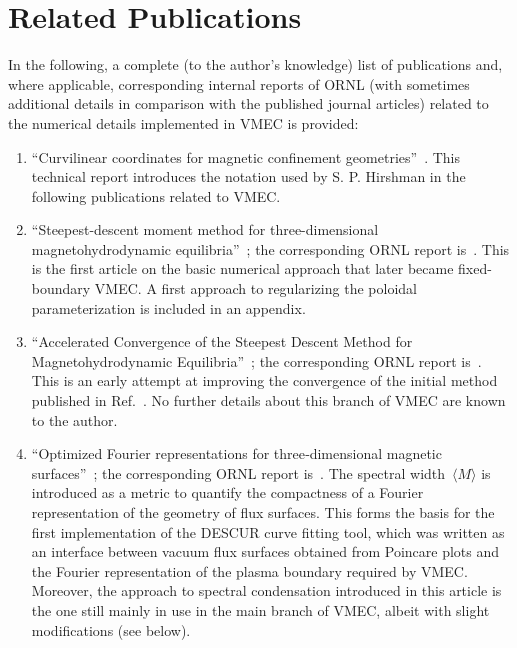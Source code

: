 \documentclass[a4paper,11pt]{book}
\begin{document}
\section*{Related Publications}
%
In the following, a complete (to the author's knowledge) list
of publications and, where applicable, corresponding internal reports of ORNL
(with sometimes additional details in comparison with the published journal articles)
related to the numerical details implemented in VMEC is provided:
\begin{enumerate}
 \item ``Curvilinear coordinates for magnetic confinement geometries''~\cite{ornl_tm_8393_hirshman_1982}.
       This technical report introduces the notation used by S. P. Hirshman
       in the following publications related to VMEC.
 \item ``Steepest-descent moment method for three-dimensional magnetohydrodynamic equilibria''~\cite{hirshman_whitson_1983};
       the corresponding ORNL report is~\cite{ornl_tm_8861_hirshman_whitson_1983}.
       This is the first article on the basic numerical approach that later became fixed-boundary VMEC.
       A first approach to regularizing the poloidal parameterization is included in an appendix.
 \item ``Accelerated Convergence of the Steepest Descent Method for Magnetohydrodynamic Equilibria''~\cite{handy_hirshman_1985};
       the corresponding ORNL report is~\cite{ornl_tm_9133_handy_hirshman_1984}.
       This is an early attempt at improving the convergence of the initial method published in Ref.~\cite{hirshman_whitson_1983}.
       No further details about this branch of VMEC are known to the author.
 \item ``Optimized Fourier representations for three‐dimensional magnetic surfaces''~\cite{hirshman_meier_1985};
       the corresponding ORNL report is~\cite{ornl_tm_9300_hirshman_meier_1984}.
       The spectral width~$\langle M \rangle$ is introduced as a metric
       to quantify the compactness of a Fourier representation of the geometry of flux surfaces.
       This forms the basis for the first implementation of the DESCUR curve fitting tool,
       which was written as an interface between vacuum flux surfaces obtained from Poincare plots
       and the Fourier representation of the plasma boundary required by VMEC.
       Moreover, the approach to spectral condensation introduced in this article
       is the one still mainly in use in the main branch of VMEC,
       albeit with slight modifications (see below).

\end{enumerate}
\end{document}
